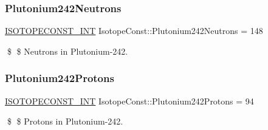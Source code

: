 \subsubsection{\texorpdfstring{Plutonium242\+Neutrons}{Plutonium242Neutrons}}
{\footnotesize\ttfamily \mbox{\hyperlink{group___isotope_const-_macros_ga5f18360b3e99483a35c32d789e62621c}{I\+S\+O\+T\+O\+P\+E\+C\+O\+N\+S\+T\+\_\+\+I\+NT}} Isotope\+Const\+::\+Plutonium242\+Neutrons = 148}

\$ \$ Neutrons in Plutonium-\/242. \mbox{\label{group___isotope_const-_plutonium-_pu242_ga4ea7e53d55a009819411747c8e2119ea}} 
\subsubsection{\texorpdfstring{Plutonium242\+Protons}{Plutonium242Protons}}
{\footnotesize\ttfamily \mbox{\hyperlink{group___isotope_const-_macros_ga5f18360b3e99483a35c32d789e62621c}{I\+S\+O\+T\+O\+P\+E\+C\+O\+N\+S\+T\+\_\+\+I\+NT}} Isotope\+Const\+::\+Plutonium242\+Protons = 94}

\$ \$ Protons in Plutonium-\/242. 